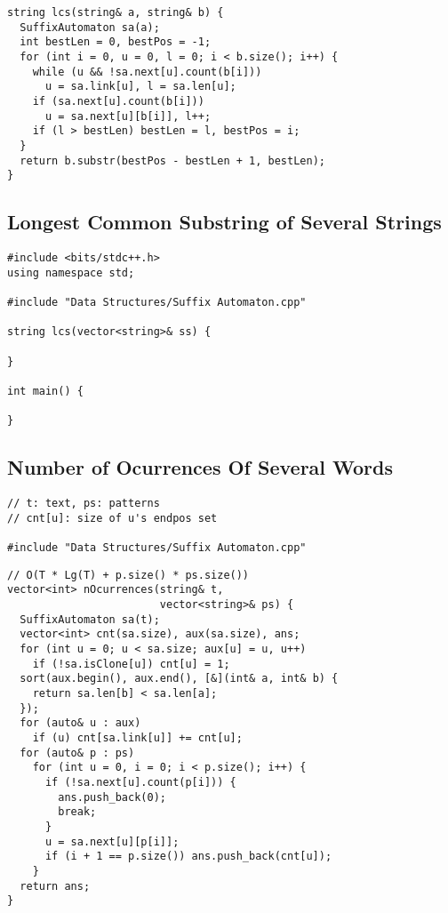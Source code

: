 \documentclass[twoside]{article}
\begin{document}
\begin{multicols*}{2}
\begin{verbatim}
string lcs(string& a, string& b) {
  SuffixAutomaton sa(a);
  int bestLen = 0, bestPos = -1;
  for (int i = 0, u = 0, l = 0; i < b.size(); i++) {
    while (u && !sa.next[u].count(b[i]))
      u = sa.link[u], l = sa.len[u];
    if (sa.next[u].count(b[i]))
      u = sa.next[u][b[i]], l++;
    if (l > bestLen) bestLen = l, bestPos = i;
  }
  return b.substr(bestPos - bestLen + 1, bestLen);
}
\end{verbatim}

\subsectionfont{\large\bfseries\sffamily\underline}
\subsection*{Longest Common Substring of Several Strings}
\begin{verbatim}
#include <bits/stdc++.h>
using namespace std;

#include "Data Structures/Suffix Automaton.cpp"

string lcs(vector<string>& ss) {
  
}

int main() {

}
\end{verbatim}

\subsectionfont{\large\bfseries\sffamily\underline}
\subsection*{Number of Ocurrences Of Several Words}
\begin{verbatim}
// t: text, ps: patterns
// cnt[u]: size of u's endpos set

#include "Data Structures/Suffix Automaton.cpp"
\end{verbatim}
\vspace{-12pt}
\begin{verbatim}
// O(T * Lg(T) + p.size() * ps.size())
vector<int> nOcurrences(string& t,
                        vector<string>& ps) {
  SuffixAutomaton sa(t);
  vector<int> cnt(sa.size), aux(sa.size), ans;
  for (int u = 0; u < sa.size; aux[u] = u, u++)
    if (!sa.isClone[u]) cnt[u] = 1;
  sort(aux.begin(), aux.end(), [&](int& a, int& b) {
    return sa.len[b] < sa.len[a];
  });
  for (auto& u : aux)
    if (u) cnt[sa.link[u]] += cnt[u];
  for (auto& p : ps)
    for (int u = 0, i = 0; i < p.size(); i++) {
      if (!sa.next[u].count(p[i])) {
        ans.push_back(0);
        break;
      }
      u = sa.next[u][p[i]];
      if (i + 1 == p.size()) ans.push_back(cnt[u]);
    }
  return ans;
}
\end{verbatim}


\end{multicols*}
\end{document}

